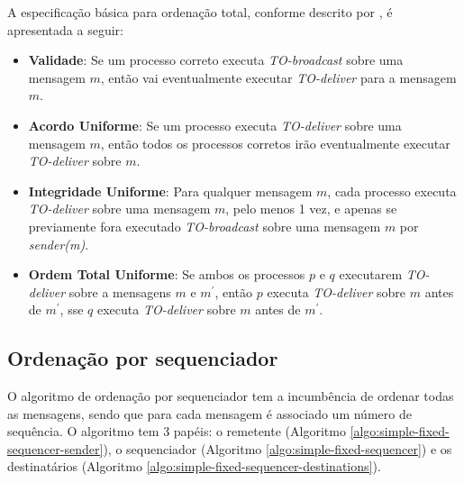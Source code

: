 
A especificação básica para ordenação total,
conforme descrito por
\textcite{hadzilacos-10.5555/866693},
é apresentada a seguir:





\begin{itemize}
\item \textbf{Validade}: Se um processo correto executa \textit{TO-broadcast} sobre uma mensagem $m$, então vai eventualmente executar \textit{TO-deliver} para a mensagem $m$.
\item \textbf{Acordo Uniforme}: Se um processo executa \textit{TO-deliver} sobre uma mensagem $m$, então todos os processos corretos irão eventualmente executar \textit{TO-deliver} sobre $m$.
\item \textbf{Integridade Uniforme}: Para qualquer mensagem $m$, cada processo executa \textit{TO-deliver} sobre uma mensagem $m$, pelo menos 1 vez, e apenas se previamente fora executado \textit{TO-broadcast} sobre uma mensagem $m$ por \textit{sender(m)}.
\item \textbf{Ordem Total Uniforme}: Se ambos os processos $p$ e $q$ executarem \textit{TO-deliver} sobre a mensagens $m$ e $m^{'}$, então $p$ executa \textit{TO-deliver} sobre $m$ antes de $m^{'}$, sse $q$ executa \textit{TO-deliver} sobre $m$ antes de $m^{'}$.
\end{itemize}

\subsection{Ordenação por sequenciador}

O algoritmo de ordenação por sequenciador \cite{journals/csur/DefagoSU04} tem a incumbência de ordenar todas as mensagens, sendo que para cada mensagem é associado um número de sequência. O algoritmo tem 3 papéis: o remetente (Algoritmo \ref{algo:simple-fixed-sequencer-sender}), o sequenciador (Algoritmo \ref{algo:simple-fixed-sequencer}) e os destinatários (Algoritmo \ref{algo:simple-fixed-sequencer-destinations}).


